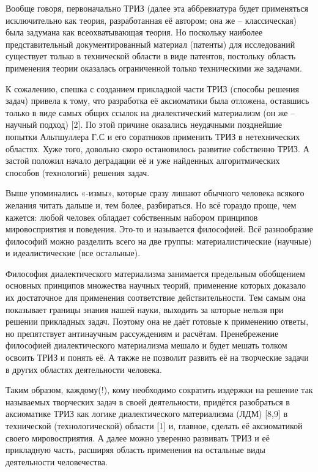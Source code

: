 \documentclass[11pt,a4paper]{article}
\begin{document}
Вообще говоря, первоначально ТРИЗ (далее эта аббревиатура будет применяться исключительно как теория, разработанная её автором; она же – классическая) была задумана как всеохватывающая теория. Но поскольку наиболее представительный документированный материал (патенты) для исследований существует только в технической области в виде патентов, постольку область применения теории оказалась ограниченной только техническими же задачами.

К сожалению, спешка с созданием прикладной части ТРИЗ (способы решения задач) привела к тому, что разработка её аксиоматики была отложена, оставшись только в виде самых общих ссылок на диалектический материализм (он же – научный подход) [2]. По этой причине оказались неудачными позднейшие попытки Альтшуллера Г.С и его соратников применить ТРИЗ в нетехнических областях. Хуже того, довольно скоро остановилось развитие собственно ТРИЗ. А застой положил начало деградации её и уже найденных алгоритмических способов (технологий) решения задач.

Выше упоминались «-измы», которые сразу лишают обычного человека всякого желания читать дальше и, тем более, разбираться. Но всё гораздо проще, чем кажется: любой человек обладает собственным набором принципов мировосприятия и поведения. Это-то и называется философией. Всё разнообразие философий можно разделить всего на две группы: материалистические (научные) и идеалистические (все остальные).

Философия диалектического материализма занимается предельным обобщением основных принципов множества научных теорий, применение которых доказало их достаточное для применения соответствие действительности. Тем самым она показывает границы знания нашей науки, выходить за которые нельзя при решении прикладных задач. Поэтому она не даёт готовые к применению ответы, но препятствует антинаучным рассуждениям и расчётам. Пренебрежение философией диалектического материализма мешало и будет мешать толком освоить ТРИЗ и понять её. А также не позволит развить её на творческие задачи в других областях деятельности человека.

Таким образом, каждому(!), кому необходимо сократить издержки на решение так называемых творческих задач в своей деятельности, придётся разобраться в аксиоматике ТРИЗ как логике диалектического материализма (ЛДМ) [8,9] в технической (технологической) области [1] и, главное, сделать её аксиоматикой своего мировосприятия. А далее можно уверенно развивать ТРИЗ и её прикладную часть, расширяя область применения на остальные виды деятельности человечества.
\end{document}
